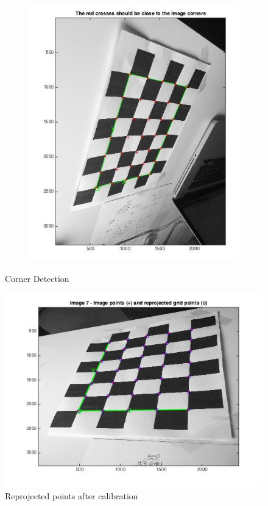 \documentclass{ethz_report}
\begin{document}
\begin{figure}[H]
\begin{subfigure}[b]{.5\textwidth}
  \includegraphics[width=1\linewidth]{images/corner_detection_2}
\end{subfigure}
\caption{Corner Detection}
\end{figure}



\begin{figure}[H]
\centering
\includegraphics[width=.9\linewidth]{images/reprojection_image}
\caption{Reprojected points after calibration}
\end{figure}
\end{document}

